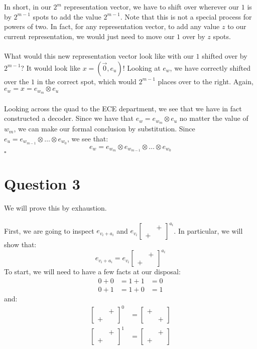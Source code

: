 \documentclass[letterpaper]{article}
\newcommand*{\QED}{\hfill\ensuremath{\square}}%
\begin{document}
In short, in our $ 2^m $ representation vector, we have to shift over wherever our $ 1 $ is by $ 2^{m - 1} $ spots to add the value $ 2^{m - 1} $.
Note that this is not a special process for powers of two.
In fact, for any representation vector, to add any value $ z $ to our current representation, we would just need to move our $ 1 $ over by $ z $ spots.
\\ \\
What would this new representation vector look like with our $ 1 $ shifted over by $ 2^{m-1} $?
It would look like $ x = (\vec{0}, e_u) $!
Looking at $ e_w $, we have correctly shifted over the $ 1 $ in the correct spot, which would $ 2^{m - 1} $ places over to the right.
Again, $ e_w = x = e_{w_m} \otimes e_u $
\\ \\
Looking across the quad to the ECE department, we see that we have in fact constructed a decoder.
Since we have that $ e_w = e_{w_m} \otimes e_u $ no matter the value of $ w_m $, we can make our formal conclusion by substitution.
Since $ e_u = e_{w_{m-1}} \otimes \ldots \otimes e_{w_{0}} $, we see that:
$$ e_w = e_{w_m} \otimes e_{w_{m-1}} \otimes \ldots \otimes e_{w_{0}} $$
\QED{}

\section{Question 3}
\label{sec:Question3}

We will prove this by exhaustion.
\\ \\
First, we are going to inspect $ e_{v_{i} + a_{i}} $ and $ e_{v_{i}} \begin{bmatrix} & + \\ + & \end{bmatrix}^{a_{i}} $.
In particular, we will show that:
\[
e_{v_{i} + a_{i}} = e_{v_{i}} \begin{bmatrix} & + \\ + & \end{bmatrix}^{a_{i}}
\]
To start, we will need to have a few facts at our disposal:
\begin{align}
    0 + 0 &= 1 + 1 &= 0 \\
    0 + 1 &= 1 + 0 &= 1
\end{align}
and:
\begin{align}
    \begin{bmatrix} & + \\ + & \end{bmatrix}^{0} &= \begin{bmatrix} + & \\ & + \end{bmatrix} \\
    \begin{bmatrix} & + \\ + & \end{bmatrix}^{1} &= \begin{bmatrix} & + \\ + & \end{bmatrix}
\end{align}
\end{document}
